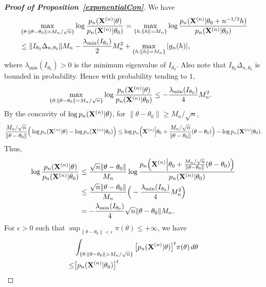 \documentclass[3p]{elsarticle}
\theoremstyle{plain}
\theoremstyle{definition}
\theoremstyle{remark}
\begin{document}
\begin{appendices}
\begin{proof}[\textbf{Proof of Proposition~\ref{exponentialCon}}]
    We have
    $$
    \begin{aligned}
        &\max_{\{\theta:\|\theta-\theta_0\|=M_n/\sqrt{n}\}}
    \log\frac{p_n(\BX^{(n)}|\theta)}{p_n(\BX^{(n)}|\theta_0)}
    =
    \max_{\{h:\|h\|=M_n\}}
    \log\frac{p_n(\BX^{(n)}|\theta_0+n^{-1/2}h)}{p_n(\BX^{(n)}|\theta_0)}
        \\
        &\leq
         \|I_{\theta_0}\Delta_{n,\theta_0}\| M_n -\frac{\lambda_{\min}(I_{\theta_0})}{2} M_n^2+
        \max_{\{h:\|h\|=M_n\}}|g_n(h)|,
    \end{aligned}
    $$
    where $\lambda_{\min}(I_{\theta_0})>0$ is the minimum eigenvalue of $I_{\theta_0}$.
    Also note that $I_{\theta_0}\Delta_{n,\theta_0}$ is bounded in probability. Hence with probability tending to $1$,
    $$
    \begin{aligned}
        &\max_{\{\theta:\|\theta-\theta_0\|=M_n/\sqrt{n}\}}
    \log\frac{p_n(\BX^{(n)}|\theta)}{p_n(\BX^{(n)}|\theta_0)}
        \leq 
        -\frac{\lambda_{\min}(I_{\theta_0})}{4}M_n^2.
    \end{aligned} 
    $$
    By the concavity of $\log p_n(\BX^{(n)}|\theta)$, for $\|\theta-\theta_0\|\geq M_n/\sqrt{n}$,
    $$
     \frac{M_n/\sqrt{n}}{\|\theta-\theta_0\|}
     \Big(
     \log p_n(\BX^{(n)}|\theta)-\log p_n(\BX^{(n)}|\theta_0)
     \Big)
     \leq
     \log p_n \Big(\BX^{(n)}\Big|\theta_0+\frac{M_n/\sqrt{n}}{\|\theta-\theta_0\|}(\theta-\theta_0)\Big)-\log p_n(\BX^{(n)}|\theta_0).
    $$
    Thus,
    $$
    \begin{aligned}
     \log \frac{p_n(\BX^{(n)}|\theta)}{ p_n(\BX^{(n)}|\theta_0)}
        &\leq
        \frac{\sqrt{n}\|\theta-\theta_0\|}{M_n}
     \log \frac{p_n\Big(\BX^{(n)}\Big|\theta_0+\frac{M_n/\sqrt{n}}{\|\theta-\theta_0\|}(\theta-\theta_0)\Big)}{ p_n(\BX^{(n)}|\theta_0)}
        \\
        &\leq
        \frac{\sqrt{n}\|\theta-\theta_0\|}{M_n}
        \Big(-\frac{\lambda_{\min}(I_{\theta_0})}{4}M_n^2\Big)
        \\
        &=
        -\frac{\lambda_{\min}(I_{\theta_0})}{4}\sqrt{n}\|\theta-\theta_0\|
        M_n.
    \end{aligned}
    $$
    For $\epsilon>0$ such that $\sup_{\|\theta-\theta_0\|< \epsilon}\pi(\theta)\leq +\infty $, we have
$$
    \begin{aligned}
        &\int_{\{\theta:\|\theta-\theta_0\|> M_n/\sqrt{n}\}} \big[p_n(\BX^{(n)}|\theta)\big]^t \pi(\theta)\, d\theta
        \\
        \leq&
        \big[p_n(\BX^{(n)}|\theta_0)\big]^t 

\end{aligned}$$
\end{proof}
\end{appendices}
\end{document}
